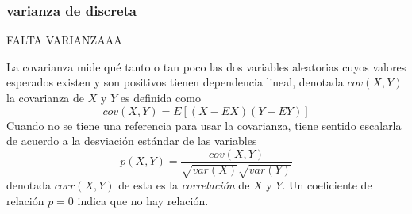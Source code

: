 \subsubsection{varianza de discreta}
FALTA VARIANZAAA

La covarianza mide qué tanto o tan poco las dos variables aleatorias cuyos valores esperados existen y son positivos tienen dependencia lineal, denotada $cov(X,Y)$ la covarianza de $X$ y $Y$ es definida como
\begin{equation}
cov(X,Y)=E[(X-EX)(Y-EY)]
\end{equation}
Cuando no se tiene una referencia para usar la covarianza, tiene sentido escalarla de acuerdo a la desviación estándar de las variables\cite{mat17}
\begin{equation}
p(X,Y)=\frac{cov(X,Y)}{\sqrt{var(X)}\sqrt{var(Y)}}
\end{equation}
denotada $corr(X,Y)$ de esta es la \emph{correlación} de $X$ y $Y$. Un coeficiente de relación $p = 0$ indica que no hay relación.
